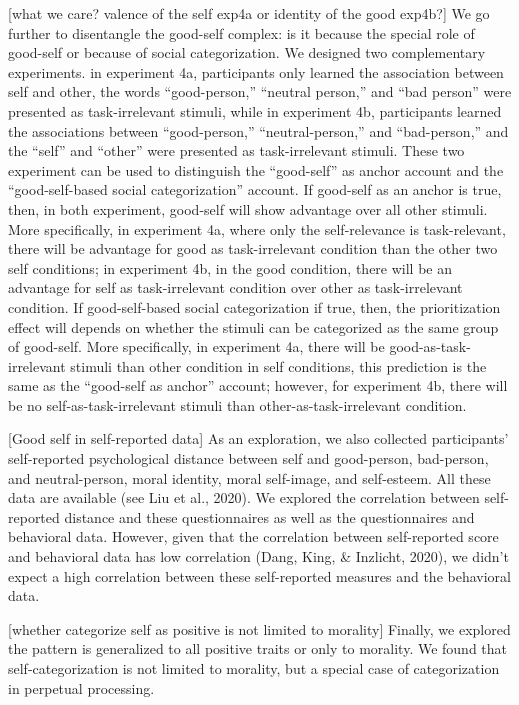 \documentclass[
  english,
  man]{apa6}
\begin{document}
{[}what we care? valence of the self exp4a or identity of the good exp4b?{]} We go further to disentangle the good-self complex: is it because the special role of good-self or because of social categorization. We designed two complementary experiments. in experiment 4a, participants only learned the association between self and other, the words ``good-person,'' ``neutral person,'' and ``bad person'' were presented as task-irrelevant stimuli, while in experiment 4b, participants learned the associations between ``good-person,'' ``neutral-person,'' and ``bad-person,'' and the ``self'' and ``other'' were presented as task-irrelevant stimuli. These two experiment can be used to distinguish the ``good-self'' as anchor account and the ``good-self-based social categorization'' account. If good-self as an anchor is true, then, in both experiment, good-self will show advantage over all other stimuli. More specifically, in experiment 4a, where only the self-relevance is task-relevant, there will be advantage for good as task-irrelevant condition than the other two self conditions; in experiment 4b, in the good condition, there will be an advantage for self as task-irrelevant condition over other as task-irrelevant condition. If good-self-based social categorization if true, then, the prioritization effect will depends on whether the stimuli can be categorized as the same group of good-self. More specifically, in experiment 4a, there will be good-as-task-irrelevant stimuli than other condition in self conditions, this prediction is the same as the ``good-self as anchor'' account; however, for experiment 4b, there will be no self-as-task-irrelevant stimuli than other-as-task-irrelevant condition.

{[}Good self in self-reported data{]} As an exploration, we also collected participants' self-reported psychological distance between self and good-person, bad-person, and neutral-person, moral identity, moral self-image, and self-esteem. All these data are available (see Liu et al., 2020). We explored the correlation between self-reported distance and these questionnaires as well as the questionnaires and behavioral data. However, given that the correlation between self-reported score and behavioral data has low correlation (Dang, King, \& Inzlicht, 2020), we didn't expect a high correlation between these self-reported measures and the behavioral data.

{[}whether categorize self as positive is not limited to morality{]} Finally, we explored the pattern is generalized to all positive traits or only to morality. We found that self-categorization is not limited to morality, but a special case of categorization in perpetual processing.
\end{document}
